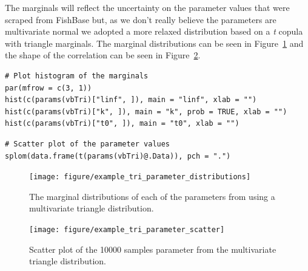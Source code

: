 \documentclass[a4paper,english,10pt]{article}\usepackage[]{graphicx}\usepackage[]{color}
\makeatletter
\newenvironment{kframe}{%
 \def\at@end@of@kframe{}%
 \ifinner\ifhmode%
  \def\at@end@of@kframe{\end{minipage}}%
  \begin{minipage}{\columnwidth}%
 \fi\fi%
 \def\FrameCommand##1{\hskip\@totalleftmargin \hskip-\fboxsep
 \colorbox{shadecolor}{##1}\hskip-\fboxsep
     \hskip-\linewidth \hskip-\@totalleftmargin \hskip\columnwidth}%
 \MakeFramed {\advance\hsize-\width
   \@totalleftmargin\z@ \linewidth\hsize
   \@setminipage}}%
 {\par\unskip\endMakeFramed%
 \at@end@of@kframe}
\newenvironment{knitrout}{}{} %
\makeatother
\begin{document}
The marginals will reflect the uncertainty on the parameter values that were scraped from FishBase but, as we don't really believe the parameters are multivariate normal we adopted a more relaxed distribution based on a \emph{t} copula with triangle marginals.
The marginal distributions can be seen in Figure~\ref{fig:plot_tri_params} and the shape of the correlation can be seen in Figure~\ref{fig:plot_tri_scatter}.

\begin{knitrout}
\color{fgcolor}\begin{kframe}
\begin{verbatim}
# Plot histogram of the marginals
par(mfrow = c(3, 1))
hist(c(params(vbTri)["linf", ]), main = "linf", xlab = "")
hist(c(params(vbTri)["k", ]), main = "k", prob = TRUE, xlab = "")
hist(c(params(vbTri)["t0", ]), main = "t0", xlab = "")
\end{verbatim}
\end{kframe}
\end{knitrout}


\begin{knitrout}
\color{fgcolor}\begin{kframe}
\begin{verbatim}
# Scatter plot of the parameter values
splom(data.frame(t(params(vbTri)@.Data)), pch = ".")
\end{verbatim}
\end{kframe}
\end{knitrout}


\begin{figure}[h]
\begin{knitrout}
\color{fgcolor}

{\centering \texttt{[image: figure/example\_tri\_parameter\_distributions]} 

}



\end{knitrout}

\caption{The marginal distributions of each of the parameters from using a multivariate triangle distribution.}
\label{fig:plot_tri_params}
\end{figure}


\begin{figure}[h]
\begin{knitrout}
\color{fgcolor}

{\centering \texttt{[image: figure/example\_tri\_parameter\_scatter]} 

}



\end{knitrout}

\caption{Scatter plot of the 10000 samples parameter from the multivariate triangle distribution.}
\label{fig:plot_tri_scatter}
\end{figure}
\end{document}
